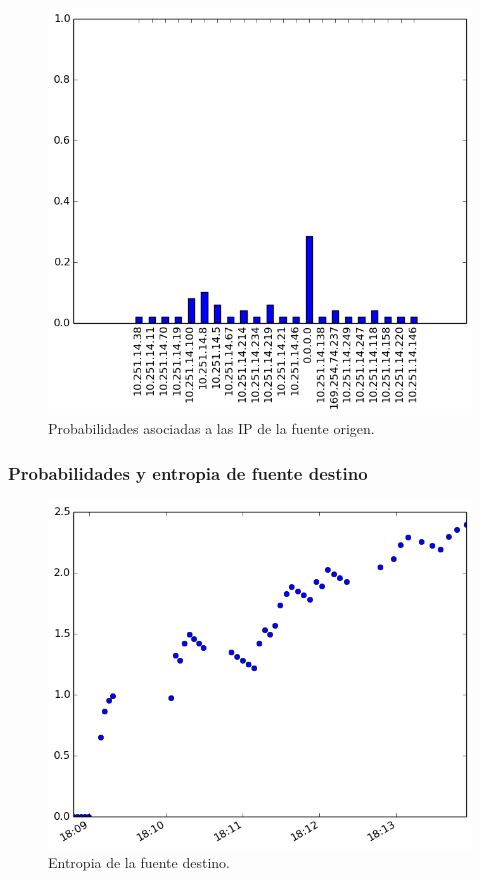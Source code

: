 \begin{figure}[h!]
  \centering
	\includegraphics[scale=0.66]{../experimentacion-svilerino/starbucks/full-experiment-1/histogram_src_probabilities.png}
  \caption{Probabilidades asociadas a las IP de la fuente origen.}
  \label{fig:probabilidad-src-starbucks}
\end{figure}


\subsubsection{Probabilidades y entropia de fuente destino}
\begin{figure}[h!]
  \centering
	\includegraphics[scale=0.66]{../experimentacion-svilerino/starbucks/full-experiment-1/entropy_dst.png}
  \caption{Entropia de la fuente destino.}
  \label{fig:entropia-dst-starbucks}
\end{figure}

